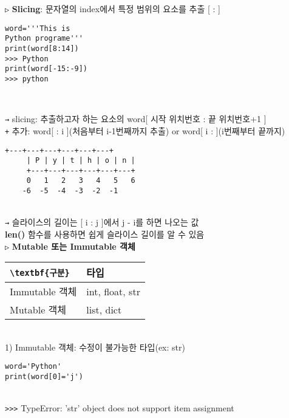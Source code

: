 \documentclass[11pt,a4paper]{article}
\begin{document}
\texttt{▷} \textbf{Slicing}: 문자열의 index에서 특정 범위의 요소를 추출 [ : ]
\begin{lstlisting}[label={list:first},caption=Slicing]
word='''This is
Python programe'''
print(word[8:14])
>>> Python
print(word[-15:-9])
>>> python
\end{lstlisting}\\

\begin{spacing}{1.5}
\texttt{→} slicing: 추출하고자 하는 요소의 word[ 시작 위치번호 : 끝 위치번호+1 ]\\
\texttt{+} 추가: word[  : i ](처음부터 i-1번째까지 추출) or word[ i :  ](i번째부터 끝까지)\\
\end{spacing}
\begin{lstlisting}[label={list:first},caption=Index example]
     +---+---+---+---+---+---+
     | P | y | t | h | o | n |
     +---+---+---+---+---+---+
     0   1   2   3   4   5   6
    -6  -5  -4  -3  -2  -1
\end{lstlisting}\\
\texttt{→} 슬라이스의 길이는 [ i : j ]에서 j - i를 하면 나오는 값\\
\hspace*{1em}\textbf{len()} 함수를 사용하면 쉽게 슬라이스 길이를 알 수 있음\\

\texttt{▷} \textbf{Mutable 또는 Immutable 객체}\\

\begin{tabular}{|>{\centering\arraybackslash}m{4cm}|>{\centering\arraybackslash}m{6cm}|}
\hline
\rowcolors[gray]{0.9}
\verb|\textbf{구분}| & \textbf{타입} \\
\hline
Immutable 객체 & int, float, str \\
\hline
Mutable 객체 & list, dict \\
\hline
\end{tabular}\\

\hspace*{2em}1) Immutable 객체: 수정이 불가능한 타입(ex: str)
\begin{lstlisting}[label={list:first}]
word='Python'
print(word[0]='j')
\end{lstlisting}\\
\hspace*{4em}\verb|>>>| TypeError: 'str' object does not support item assignment\\
\end{document}
